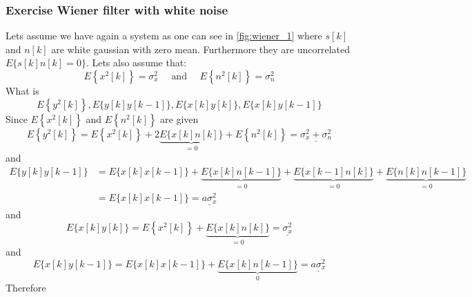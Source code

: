 \subsubsection{Exercise Wiener filter with white noise}
Lets assume we have again a system as one can see in \autoref{fig:wiener_1} where $s[k]$ and $n[k]$ are white gaussian with zero mean. Furthermore they are uncorrelated $E\{s[k]n[k]=0\}$. Lets also assume that:
$$
E\left\{x^2[k]\right\}=\sigma_x^2 \quad \text { and } \quad E\left\{n^2[k]\right\}=\sigma_n^2
$$
What is 
$$
E\left\{y^2[k]\right\}, E\{y[k] y[k-1]\}, E\{x[k] y[k]\}, E\{x[k] y[k-1]\}
$$
Since $E\left\{x^2[k]\right\}$ and $E\left\{n^2[k]\right\}$ are given 
$$
E\left\{y^2[k]\right\}=E\left\{x^2[k]\right\}+2 \underbrace{E\{x[k] n[k]\}}_{=0}+E\left\{n^2[k]\right\}=\underline{\sigma_x^2+\sigma_n^2}
$$
and
$$
\begin{aligned}
E\{y[k] y[k-1]\} & =E\{x[k] x[k-1]\}+\underbrace{E\{x[k] n[k-1]\}}_{=0}+\underbrace{E\{x[k-1] n[k]\}}_{=0}+\underbrace{E\{n[k] n[k-1]\}}_{=0} \\
& =E\{x[k] x[k-1]\}=\underline{a \sigma_x^2}
\end{aligned}
$$
and 
$$
E\{x[k] y[k]\}=E\left\{x^2[k]\right\}+\underbrace{E\{x[k] n[k]\}}_{=0}=\underline{\sigma_x^2}
$$
and 
$$
E\{x[k] y[k-1]\}=E\{x[k] x[k-1]\}+\underbrace{E\{x[k] n[k-1]\}}_0=\underline{a \sigma_x^2}
$$
Therefore 
